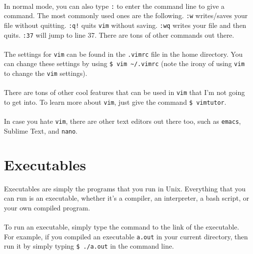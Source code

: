 \documentclass{article}
\begin{document}
\paragraph{} In normal mode, you can also type \texttt{:} to enter the command line to give a command. The most commonly used ones are the following. \texttt{:w} writes/saves your file without quitting. \texttt{:q!} quits \texttt{vim} without saving. \texttt{:wq} writes your file and then quits. \texttt{:37} will jump to line 37. There are tons of other commands out there.

\paragraph{} The settings for \texttt{vim} can be found in the \texttt{.vimrc} file in the home directory. You can change these settings by using \texttt{\$ vim \~\//.vimrc} (note the irony of using \texttt{vim} to change the \texttt{vim} settings).

\paragraph{} There are tons of other cool features that can be used in \texttt{vim} that I'm not going to get into. To learn more about \texttt{vim}, just give the command \texttt{\$ vimtutor}.

\paragraph{} In case you hate \texttt{vim}, there are other text editors out there too, such as \texttt{emacs}, Sublime Text, and \texttt{nano}.

\section{Executables}

\paragraph{} Executables are simply the programs that you run in Unix. Everything that you can run is an executable, whether it's a compiler, an interpreter, a bash script, or your own compiled program.

\paragraph{} To run an executable, simply type the command to the link of the executable. For example, if you compiled an executable \texttt{a.out} in your current directory, then run it by simply typing \texttt{\$ ./a.out} in the command line.
\end{document}
